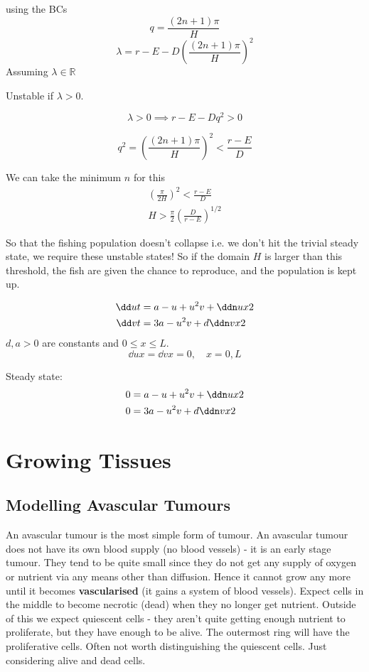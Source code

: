 \documentclass{X:/Documents/Coding/Latex/myassignment}
\begin{document}
using the BCs
\[q = \frac{(2n + 1)\pi}{H}\]
\[\lambda= r - E - D\left(\frac{(2n + 1)\pi}{H}\right)^2\]
Assuming $\lambda \in \mathbb{R}$

Unstable if $\lambda > 0 $.

\[\lambda > 0 \implies r - E - Dq^2 > 0\]

\[q^2 = \left(\frac{(2n + 1)\pi}{H}\right)^2 < \frac{r -E}{D} \]

We can take the minimum $n$ for this 
\begin{align*}
	\left(\frac{\pi}{2H}\right)^2 < \frac{r-E}{D}\\
	H > \frac{\pi}{2} \left(\frac{D}{r-E}\right)^{1/2}
\end{align*}

So that the fishing population doesn't collapse i.e. we don't hit the trivial steady state, we require these unstable states! So if the domain $H$ is larger than this threshold, the fish are given the chance to reproduce, and the population is kept up.


\begin{align*}
	\dd ut &= a -u + u^2v + \ddn ux2\\
	\dd vt &= 3a - u^2v + d \ddn vx2
\end{align*}
$d,a > 0$ are constants and $0\leq x \leq L$.
\[\dd ux = \dd vx = 0, \quad x=0, L\]

Steady state:
\begin{align*}
	0&= a - u + u^2v + \ddn ux2\\
	0&= 3a - u^2 v + d \ddn vx2
\end{align*}



\section{Growing Tissues}
\subsection{Modelling Avascular Tumours}
An avascular tumour is the most simple form of tumour. An avascular tumour does not have its own blood supply (no blood vessels) - it is an early stage tumour. They tend to be quite small since they do not get any supply of oxygen or nutrient via any means other than diffusion. Hence it cannot grow any more until it becomes \textbf{vascularised} (it gains a system of blood vessels). 
Expect cells in the middle to become necrotic (dead) when they no longer get nutrient. Outside of this we expect quiescent cells - they aren't quite getting enough nutrient to proliferate, but they have enough to be alive. The outermost ring will have the proliferative cells. Often not worth distinguishing the quiescent cells. Just considering alive and dead cells.
\end{document}
